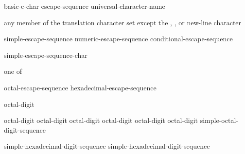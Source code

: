 \begin{bnf}
\br
    basic-c-char\br
    escape-sequence\br
    universal-character-name
\end{bnf}

\begin{bnf}
\br
    \textnormal{any member of the translation character set except the ,}\br
    \bnfindent\textnormal{, or new-line character}
\end{bnf}

\begin{bnf}
\br
    simple-escape-sequence\br
    numeric-escape-sequence\br
    conditional-escape-sequence
\end{bnf}

\begin{bnf}
\br
    \terminal{\textbackslash} simple-escape-sequence-char
\end{bnf}

\begin{bnf}
 \textnormal{one of}\br
\end{bnf}

\begin{bnf}
\br
    octal-escape-sequence\br
    hexadecimal-escape-sequence
\end{bnf}

\begin{bnf}
\br
    octal-digit 
\end{bnf}

\begin{bnf}
\br
    \terminal{\textbackslash} octal-digit\br
    \terminal{\textbackslash} octal-digit octal-digit\br
    \terminal{\textbackslash} octal-digit octal-digit octal-digit\br
     simple-octal-digit-sequence \terminal{\}}
\end{bnf}

\begin{bnf}
\br
     simple-hexadecimal-digit-sequence\br
     simple-hexadecimal-digit-sequence \terminal{\}}
\end{bnf}

